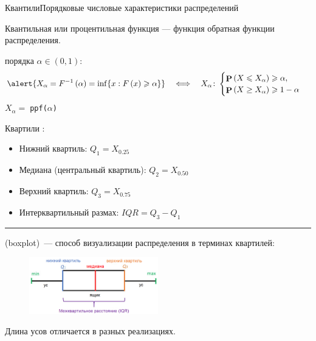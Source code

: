 \documentclass[11pt,pdf,utf8,hyperref={unicode},aspectratio=169]{beamer}
\DeclareMathOperator{\prob}{\mathbf{P}}
\begin{document}
\begin{frame}{Квантили}{Порядковые числовые характеристики распределений}

    Квантильная или процентильная функция --- функция обратная функции распределения.

         порядка $\alpha\in\left(0,1\right)$:
        $$
        \alert{X_\alpha=F^{-1}\left(\alpha\right)=\inf \lbrace x : F\left(x\right) \geqslant \alpha \rbrace}
        \quad\Longleftrightarrow\quad
        X_\alpha \colon
        \begin{cases}
            \prob\left(X\leqslant X_\alpha\right) \geqslant \alpha, \\
            \prob\left(X\geq X_\alpha\right) \geqslant 1-\alpha
        \end{cases}
        $$
     \alert{$X_\alpha = \;$\texttt{ppf($\alpha$)}}
\end{frame}

\begin{frame}{Квартили}{}
    :
    \begin{itemize}
        \item Нижний квартиль: $Q_1 = X_{0.25}$
        \item Медиана (центральный квартиль): $Q_2 = X_{0.50}$
        \item Верхний квартиль: $Q_3 = X_{0.75}$
        \item Интерквартильный размах: $IQR = Q_3-Q_1$
    \end{itemize}

    \bigskip
    \hrule

    \medskip

     (boxplot)~--- способ визуализации распределения в терминах квартилей:
    \begin{figure}
        \includegraphics[width=0.5\textwidth]{boxplot_lite.png}
    \end{figure}
    Длина усов отличается в разных реализациях.
\end{frame}
\end{document}
